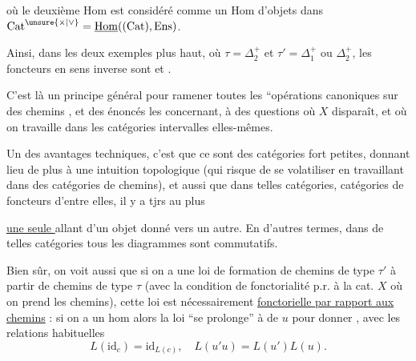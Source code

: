 où le deuxième $\mathrm{Hom}$ est considéré comme un $\mathrm{Hom}$ d'objets dans $\mathrm{Cat}^{\unsure{\times|\vee}}=\underline{\mathrm{Hom}}((\mathrm{Cat}),\mathrm{Ens})$.

Ainsi, dans les deux exemples plus haut, où $\tau=\mathbb{\Delta}_2^+$ et $\tau'=\mathbb{\Delta}_1^+$ ou $\mathbb{\Delta}_2^+$, les foncteurs en sens inverse sont
et
.

C'est là un principe général pour ramener toutes les ``opérations \inserted{$\pm$} canoniques sur des chemins , et des énoncés les concernant, à des questions où $X$ disparaît, et où on travaille dans les catégories intervalles elles-mêmes.

Un des avantages techniques, c'est que ce sont des catégories fort petites, donnant lieu de plus à une intuition topologique  (qui risque de se volatiliser  en travaillant  dans des catégories de chemins), et aussi que dans  telles catégories,   catégories de foncteurs d'entre elles, il y a tjrs au plus

\uline{une seule } allant d'un objet donné vers un autre. En d'autres termes, dans de telles catégories tous les diagrammes sont commutatifs.

Bien sûr, on voit aussi que si on a une loi de formation  de chemins de type $\tau'$ à partir de chemins de type $\tau$ (avec la condition de fonctorialité p.r. à la cat. $X$ où on prend les chemins), cette loi est nécessairement \uline{fonctorielle par rapport aux chemins} : si on  a un hom
alors la loi  ``se prolonge'' à de  $u$ pour donner
,
avec les relations habituelles
\[ L(\mathrm{id}_c)=\mathrm{id}_{L(c)},\quad L(u'u)=L(u')L(u). \]

